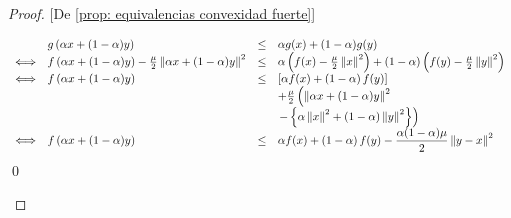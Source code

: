 \begin{proof}{[De \ref{prop: equivalencias convexidad fuerte}]}
\begin{enumerate}
		\begin{equation*}
			\begin{array}{llll}
				& g \left(\alpha x + (1-\alpha)y\right) & \leq & \alpha g(x) + (1-\alpha)g(y) \\
				\Longleftrightarrow & f\left(\alpha x + (1-\alpha)y\right) - \frac{\mu}{2} \left\lVert\alpha x + (1-\alpha)y\right\rVert^2 & \leq & \alpha \left(f(x) - \frac{\mu}{2} \left\lVert x\right\rVert^2\right) + \left(1-\alpha\right) \left(f(y) - \frac{\mu}{2} \left\lVert y\right\rVert^2\right) \\
				\Longleftrightarrow & f\left(\alpha x + (1-\alpha)y\right) & \leq & \left[\alpha f(x) + \left(1 - \alpha\right)f(y) \right] \\ &&& + \frac{\mu}{2} \left(\left\lVert\alpha x + (1-\alpha)y\right\rVert^2 \right. \\ &&&  \left. - \left\lbrace \alpha\left\lVert x\right\rVert^2 + (1-\alpha) \left\lVert y\right\rVert^2 \right\rbrace \right) \\
				\Longleftrightarrow & f\left(\alpha x + (1-\alpha)y\right) & \leq & \alpha f(x) + \left(1 - \alpha\right)f(y) - \dfrac{\alpha (1-\alpha) \mu}{2} \left\lVert y-x\right\rVert^2
			\end{array}
		\end{equation*}
		\qed
	\end{enumerate}
\end{proof}

